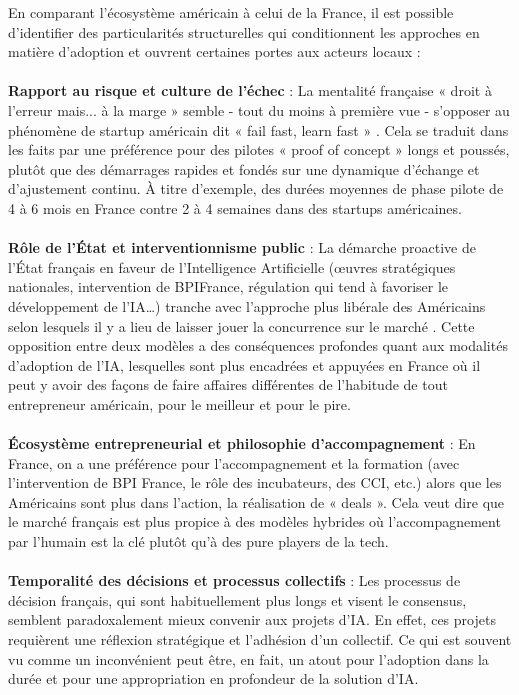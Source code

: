 En comparant l'écosystème américain à celui de la France, il est possible d'identifier des particularités structurelles qui conditionnent les approches en matière d'adoption et ouvrent certaines portes aux acteurs locaux :
\\\\
\textbf{Rapport au risque et culture de l'échec} : La mentalité française « droit à l'erreur mais... à la marge » semble - tout du moins à première vue - s'opposer au phénomène de startup américain dit « fail fast, learn fast » \cite{meyer2014culture}. Cela se traduit dans les faits par une préférence pour des pilotes « proof of concept » longs et poussés, plutôt que des démarrages rapides et fondés sur une dynamique d'échange et d'ajustement continu. À titre d'exemple, des durées moyennes de phase pilote de 4 à 6 mois en France contre 2 à 4 semaines dans des startups américaines.
\\\\
\textbf{Rôle de l'État et interventionnisme public} : La démarche proactive de l’État français en faveur de l’Intelligence Artificielle (œuvres stratégiques nationales, intervention de BPIFrance, régulation qui tend à favoriser le développement de l’IA…) tranche avec l’approche plus libérale des Américains selon lesquels il y a lieu de laisser jouer la concurrence sur le marché \cite{france_strategie2025make}. Cette opposition entre deux modèles a des conséquences profondes quant aux modalités d’adoption de l’IA, lesquelles sont plus encadrées et appuyées en France où il peut y avoir des façons de faire affaires différentes de l’habitude de tout entrepreneur américain, pour le meilleur et pour le pire.
\\\\
\textbf{Écosystème entrepreneurial et philosophie d'accompagnement} : En France, on a une préférence pour l'accompagnement et la formation (avec l'intervention de BPI France, le rôle des incubateurs, des CCI, etc.) alors que les Américains sont plus dans l'action, la réalisation de « deals ». Cela veut dire que le marché français est plus propice à des modèles hybrides où l'accompagnement par l'humain est la clé plutôt qu'à des pure players de la tech.
\\\\
\textbf{Temporalité des décisions et processus collectifs} : Les processus de décision français, qui sont habituellement plus longs et visent le consensus, semblent paradoxalement mieux convenir aux projets d’IA. En effet, ces projets requièrent une réflexion stratégique et l’adhésion d’un collectif. Ce qui est souvent vu comme un inconvénient peut être, en fait, un atout pour l’adoption dans la durée et pour une appropriation en profondeur de la solution d’IA.

